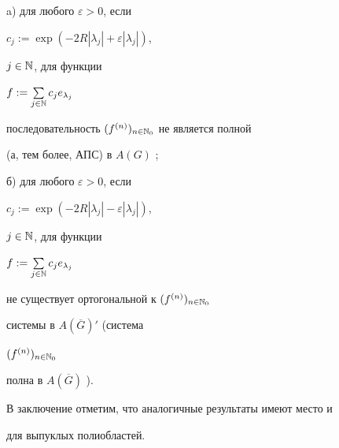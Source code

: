 \begin{note}
a) для любого $\varepsilon>0$, если


$c_j:=\exp{(-2R|\lambda_j|+\varepsilon|\lambda_j|)}$,


$j\in\Bbb N$, для функции


$f:=\sum\limits_{j\in\Bbb N}c_je_{\lambda_j}$


последовательность $(f^{(n)})_{n\in\Bbb N_0}$ не является полной


(а, тем более, АПС) в $A(G)$ \cite{MEL2};





б) для любого $\varepsilon>0$, если


$c_j:=\exp{(-2R|\lambda_j|-\varepsilon|\lambda_j|)}$,


$j\in\Bbb N$, для функции


$f:=\sum\limits_{j\in\Bbb N}c_je_{\lambda_j}$


не существует ортогональной к $(f^{(n)})_{n\in\Bbb N_0}$


системы в $A(\overline{G})'$ (система


$(f^{(n)})_{n\in\Bbb N_0}$


полна в $A(\overline{G})$ \cite{MEL2}).


\end{note}





В заключение отметим, что аналогичные результаты имеют место и


для выпуклых полиобластей.





